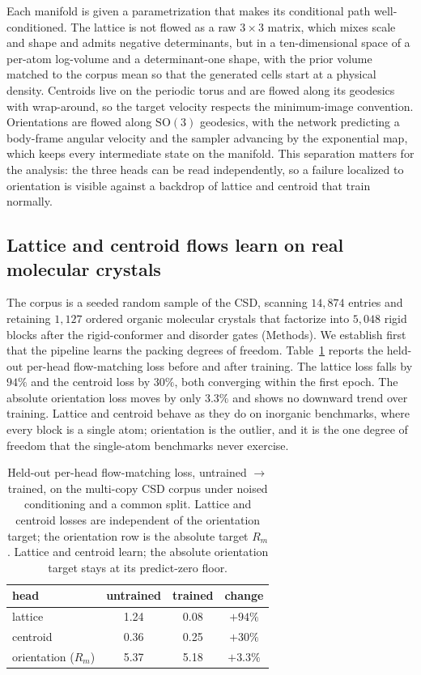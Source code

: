 \documentclass[11pt]{article}
\begin{document}
Each manifold is given a parametrization that makes its conditional path
well-conditioned. The lattice is not flowed as a raw $3\times3$ matrix, which
mixes scale and shape and admits negative determinants, but in a ten-dimensional
space of a per-atom log-volume and a determinant-one shape, with the prior
volume matched to the corpus mean so that the generated cells start at a
physical density. Centroids live on the periodic torus and are flowed along its
geodesics with wrap-around, so the target velocity respects the minimum-image
convention. Orientations are flowed along $\mathrm{SO}(3)$ geodesics, with the
network predicting a body-frame angular velocity and the sampler advancing by the
exponential map, which keeps every intermediate state on the manifold. This
separation matters for the analysis: the three heads can be read independently,
so a failure localized to orientation is visible against a backdrop of lattice
and centroid that train normally.

\subsection{Lattice and centroid flows learn on real molecular crystals}

The corpus is a seeded random sample of the CSD, scanning $14{,}874$ entries and
retaining $1{,}127$ ordered organic molecular crystals that factorize into
$5{,}048$ rigid blocks after the rigid-conformer and disorder gates (Methods).
We establish first that the pipeline learns the packing degrees of freedom.
Table~\ref{tab:perhead} reports the held-out per-head flow-matching loss before
and after training. The lattice loss falls by $94\%$ and the centroid loss by
$30\%$, both converging within the first epoch. The absolute orientation loss
moves by only $3.3\%$ and shows no downward trend over training. Lattice and
centroid behave as they do on inorganic benchmarks, where every block is a single
atom; orientation is the outlier, and it is the one degree of freedom that the
single-atom benchmarks never exercise.

\begin{table}[t]
\centering
\caption{Held-out per-head flow-matching loss, untrained $\rightarrow$ trained,
on the multi-copy CSD corpus under noised conditioning and a common split.
Lattice and centroid losses are independent of the orientation target; the
orientation row is the absolute target $R_m$. Lattice and centroid learn; the
absolute orientation target stays at its predict-zero floor.}
\label{tab:perhead}
\begin{tabular}{lccc}
\toprule
head & untrained & trained & change \\
\midrule
lattice            & 1.24 & 0.08 & $+94\%$ \\
centroid           & 0.36 & 0.25 & $+30\%$ \\
orientation ($R_m$)& 5.37 & 5.18 & $+3.3\%$ \\
\bottomrule
\end{tabular}
\end{table}
\end{document}
